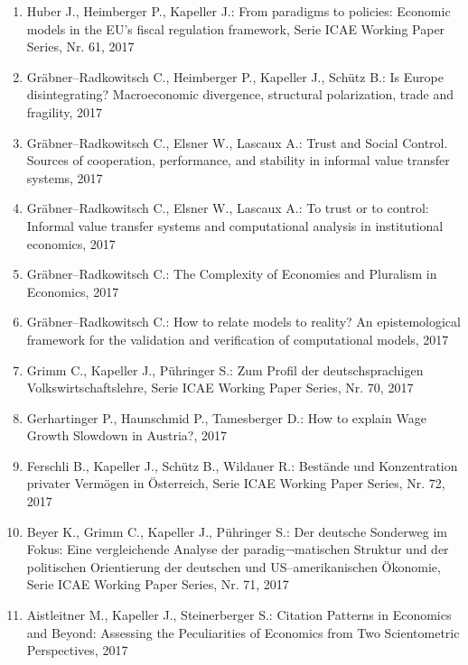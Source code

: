 \begin{enumerate}
	 \item Huber J., Heimberger P., Kapeller J.: From paradigms to policies: Economic models in the EU’s fiscal regulation framework, Serie ICAE Working Paper Series, Nr. 61, 2017
	 \item Gräbner--Radkowitsch C., Heimberger P., Kapeller J., Schütz B.: Is Europe disintegrating? Macroeconomic divergence, structural polarization, trade and fragility, 2017
	 \item Gräbner--Radkowitsch C., Elsner W., Lascaux A.: Trust and Social Control. Sources of cooperation, performance, and stability in informal value transfer systems, 2017
	 \item Gräbner--Radkowitsch C., Elsner W., Lascaux A.: To trust or to control: Informal value transfer systems and computational analysis in institutional economics, 2017
	 \item Gräbner--Radkowitsch C.: The Complexity of Economies and Pluralism in Economics, 2017
	 \item Gräbner--Radkowitsch C.: How to relate models to reality? An epistemological framework for the validation and verification of computational models, 2017
	 \item Grimm C., Kapeller J., Pühringer S.: Zum Profil der deutschsprachigen Volkswirtschaftslehre, Serie ICAE Working Paper Series, Nr. 70, 2017
	 \item Gerhartinger P., Haunschmid P., Tamesberger D.: How to explain Wage Growth Slowdown in Austria?, 2017
	 \item Ferschli B., Kapeller J., Schütz B., Wildauer R.: Bestände und Konzentration privater Vermögen in Österreich, Serie ICAE Working Paper Series, Nr. 72, 2017
	 \item Beyer K., Grimm C., Kapeller J., Pühringer S.: Der deutsche Sonderweg im Fokus: Eine vergleichende Analyse der paradig¬matischen Struktur und der politischen Orientierung der deutschen und US--amerikanischen Ökonomie, Serie ICAE Working Paper Series, Nr. 71, 2017
	 \item Aistleitner M., Kapeller J., Steinerberger S.: Citation Patterns in Economics and Beyond: Assessing the Peculiarities of Economics from Two Scientometric Perspectives, 2017
\end{enumerate}
